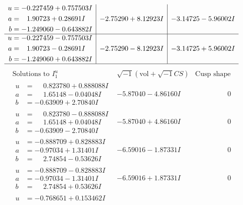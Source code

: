 \documentclass[1p]{elsarticle_modified}
\theoremstyle{definition}
\newcommand{\I}{\sqrt{-1}}
\begin{document}
$$\begin{array}{c|c|c}
\begin{aligned}
u &= -0.227459 + 0.757503 I \\
a &= \phantom{-}1.90723 + 0.28691 I \\
b &= -1.249060 - 0.643882 I\end{aligned}
 & -2.75290 + 8.12923 I & -3.14725 - 5.96002 I \\ \hline\begin{aligned}
u &= -0.227459 - 0.757503 I \\
a &= \phantom{-}1.90723 - 0.28691 I \\
b &= -1.249060 + 0.643882 I\end{aligned}
 & -2.75290 - 8.12923 I & -3.14725 + 5.96002 I\\
 \hline 
 \end{array}$$\newpage$$\begin{array}{c|c|c}  
\text{Solutions to }I^u_{1}& \I (\text{vol} + \sqrt{-1}CS) & \text{Cusp shape}\\
 \hline 
\begin{aligned}
u &= \phantom{-}0.823780 + 0.888088 I \\
a &= \phantom{-}1.65148 - 0.04048 I \\
b &= -0.63909 + 2.70840 I\end{aligned}
 & -5.87040 - 4.86160 I & \phantom{-0.000000 } 0 \\ \hline\begin{aligned}
u &= \phantom{-}0.823780 - 0.888088 I \\
a &= \phantom{-}1.65148 + 0.04048 I \\
b &= -0.63909 - 2.70840 I\end{aligned}
 & -5.87040 + 4.86160 I & \phantom{-0.000000 } 0 \\ \hline\begin{aligned}
u &= -0.888709 + 0.828883 I \\
a &= -0.97034 + 1.31401 I \\
b &= \phantom{-}2.74854 - 0.53626 I\end{aligned}
 & -6.59016 - 1.87331 I & \phantom{-0.000000 } 0 \\ \hline\begin{aligned}
u &= -0.888709 - 0.828883 I \\
a &= -0.97034 - 1.31401 I \\
b &= \phantom{-}2.74854 + 0.53626 I\end{aligned}
 & -6.59016 + 1.87331 I & \phantom{-0.000000 } 0 \\ \hline\begin{aligned}
u &= -0.768651 + 0.153462 I \\

\end{aligned}
\end{array}$$
\end{document}
